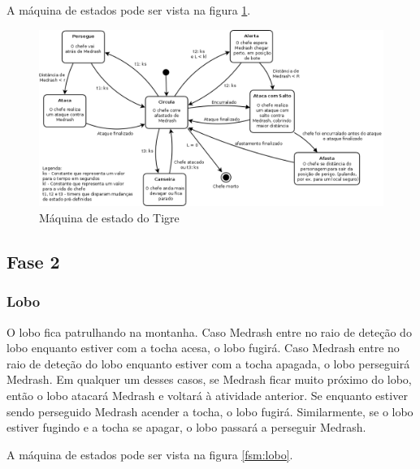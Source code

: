 A máquina de estados pode ser vista na figura \ref{fsm:tigre}.

\begin{figure}[!ht]
 \centering
 \includegraphics[scale=0.31]{ia_tigre.png}
 \caption{Máquina de estado do Tigre}
 \label{fsm:tigre}
\end{figure}

\subsection{Fase 2}

\subsubsection{Lobo}

O lobo fica patrulhando na montanha. Caso Medrash entre no raio de
deteção do lobo enquanto estiver com a tocha acesa, o lobo fugirá. Caso
Medrash entre no raio de deteção do lobo enquanto estiver com a tocha
apagada, o lobo perseguirá Medrash. Em qualquer um desses casos, se
Medrash ficar muito próximo do lobo, então o lobo atacará Medrash e
voltará à atividade anterior.
Se enquanto estiver sendo perseguido Medrash acender a tocha,
o lobo fugirá. Similarmente, se o lobo estiver fugindo e a tocha se apagar,
o lobo passará a perseguir Medrash.

A máquina de estados pode ser vista na figura \ref{fsm:lobo}.

